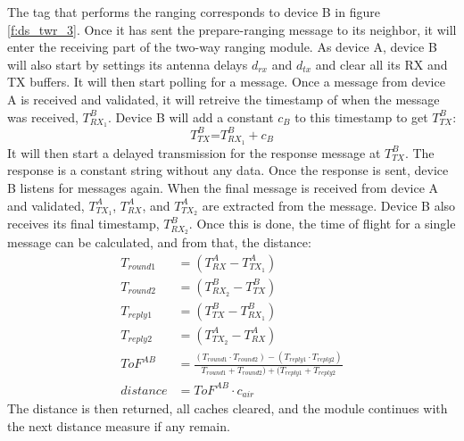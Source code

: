 The tag that performs the ranging corresponds to device B in figure \ref{f:ds_twr_3}.
Once it has sent the prepare-ranging message to its neighbor, it will enter the receiving part of the two-way ranging module.
As device A, device B will also start by settings its antenna delays $d_{rx}$ and $d_{tx}$ and clear all its RX and TX buffers.
It will then start polling for a message.
Once a message from device A is received and validated, it will retreive the timestamp of when the message was received, $T_{RX_1}^B$.
Device B will add a constant $c_B$ to this timestamp to get $T_{TX}^B$:
\begin{equation}
	\mbox{$T_{TX}^B$=}
	\mbox{$T_{RX_1}^B+c_B$}
\end{equation}
It will then start a delayed transmission for the response message at $T_{TX}^B$.
The response is a constant string without any data.
Once the response is sent, device B listens for messages again.
When the final message is received from device A and validated, $T_{TX_1}^A$, $T_{RX}^A$, and $T_{TX_2}^A$ are extracted from the message.
Device B also receives its final timestamp, $T_{RX_2}^B$.
Once this is done, the time of flight for a single message can be calculated, and from that, the distance:
\begin{align}
    T_{round1} &= (T_{RX}^A - T_{TX_1}^A) \\
    T_{round2} &= (T_{RX_2}^B - T_{TX}^B) \\
    T_{reply1} &= (T_{TX}^B - T_{RX_1}^B) \\
    T_{reply2} &= (T_{TX_2}^A - T_{RX}^A) \\
    ToF^{AB} &= \frac{(T_{round1}\cdot T_{round2}) - (T_{reply1}\cdot T_{reply2})}{T_{round1} + T_{round2}) + (T_{reply1} + T_{reply2}} \\
    distance &= ToF^{AB} \cdot c_{air}
\end{align}
The distance is then returned, all caches cleared, and the module continues with the next distance measure if any remain.


